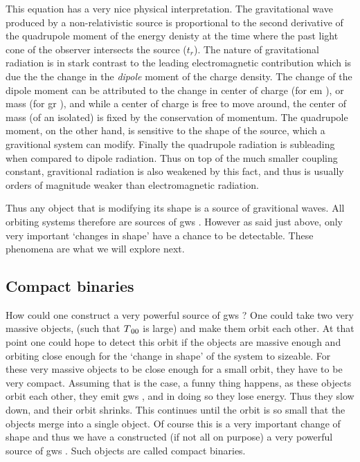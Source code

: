 \documentclass[
  10pt,
  a4paper,
  DIV=11,
  numbers=noendperiod,
  oneside]{scrreprt}
\DeclareRobustCommand{\[}{\begin{equation}}
\DeclareRobustCommand{\]}{\end{equation}}
\begin{document}
This equation has a very nice physical interpretation. The gravitational
wave produced by a non-relativistic source is proportional to the second
derivative of the quadrupole moment of the energy denisty at the time
where the past light cone of the observer intersects the source
(\(t_r\)). The nature of gravitational radiation is in stark contrast to
the leading electromagnetic contribution which is due the the change in
the \emph{dipole} moment of the charge density. The change of the dipole
moment can be attributed to the change in center of charge (for \gls{em}
), or mass (for \gls{gr} ), and while a center of charge is free to move
around, the center of mass (of an isolated) is fixed by the conservation
of momentum. The quadrupole moment, on the other hand, is sensitive to
the shape of the source, which a gravitional system can modify. Finally
the quadrupole radiation is subleading when compared to dipole
radiation. Thus on top of the much smaller coupling constant,
gravitional radiation is also weakened by this fact, and thus is usually
orders of magnitude weaker than electromagnetic radiation.

Thus any object that is modifying its shape is a source of gravitional
waves. All orbiting systems therefore are sources of \glspl{gw} .
However as said just above, only very important `changes in shape' have
a chance to be detectable. These phenomena are what we will explore
next.

\hypertarget{sec-compactbinaries}{%
\subsection{Compact binaries}\label{sec-compactbinaries}}

How could one construct a very powerful source of \glspl{gw} ? One could
take two very massive objects, (such that \(\SEco[00]\) is large) and
make them orbit each other. At that point one could hope to detect this
orbit if the objects are massive enough and orbiting close enough for
the `change in shape' of the system to sizeable. For these very massive
objects to be close enough for a small orbit, they have to be very
compact. Assuming that is the case, a funny thing happens, as these
objects orbit each other, they emit \glspl{gw} , and in doing so they
lose energy. Thus they slow down, and their orbit
shrinks. This continues until the orbit is so small that the objects
merge into a single object. Of course this is a very important change of
shape and thus we have a constructed (if not all on purpose) a very
powerful source of \glspl{gw} . Such objects are called compact
binaries.
\end{document}
